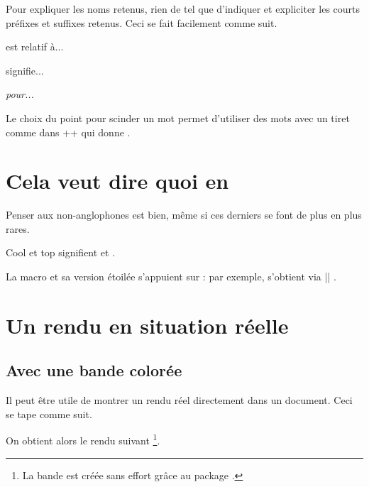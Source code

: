 Pour expliquer les noms retenus, rien de tel que d'indiquer et expliciter les courts préfixes et suffixes retenus. Ceci se fait facilement comme suit.

\begin{bdoclatex}[sbs]
 est relatif à...

 signifie...

\emph{ pour...}
\end{bdoclatex}


\begin{bdocrem}
    Le choix du point pour scinder un mot permet d'utiliser des mots avec un tiret comme dans \bdocinlatex++ qui donne .
\end{bdocrem}


\section{Cela veut dire quoi en }

Penser aux non-anglophones est bien, même si ces derniers se font de plus en plus rares.

\begin{bdoclatex}
Cool et top signifient  et .
\end{bdoclatex}


La macro  et sa version étoilée s'appuient sur  : par exemple,  s'obtient via \bdocinlatex|| .


\section{Un rendu en situation réelle} \label{bdoc-showcase}

\subsection{Avec une bande colorée}

\begin{bdocexa}
    Il peut être utile de montrer un rendu réel directement dans un document.
    Ceci se tape comme suit.


    On obtient alors le rendu suivant
    \footnote{
        La bande est créée sans effort grâce au package .
    }.

    \medskip

    
\end{bdocexa}


